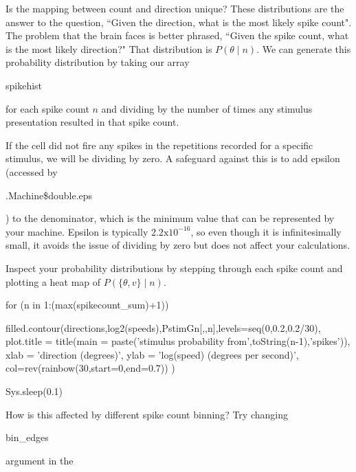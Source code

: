 \documentclass[
letterpaper, %
11pt, %
 oneside, 
onecolumn, %
]{memoir}
\numberwithin{Exercise}{chapter}
\begin{document}
Is the mapping between count and direction unique?  These distributions are the answer to the question, ``Given the direction, what is the most likely spike count".  The problem that the brain faces is better phrased, ``Given the spike count, what is the most likely direction?"  That distribution is $P(\theta \mid n)$. We can generate this probability distribution by taking our array \begin{ttfamily}spikehist\end{ttfamily} for each spike count $n$ and dividing by the number of times any stimulus presentation resulted in that spike count. 

If the cell did not fire any spikes in the repetitions recorded for a specific stimulus, we will be dividing by zero.  A safeguard against this is to add epsilon (accessed by \begin{ttfamily} .Machine\$double.eps \end{ttfamily}) to the denominator, which is the minimum value that can be represented by your machine. Epsilon is typically $ 2.2 \mathrm{x} 10^{-16} $, so even though it is infinitesimally small, it avoids the issue of dividing by zero but does not affect your calculations. 


Inspect your probability distributions by stepping through each spike count and plotting a heat map of $P(\{\theta, v\}\mid n)$. 

\begin{shortrcode}
for (n in 1:(max(spikecount_sum)+1)){
  
  
  filled.contour(directions,log2(speeds),PstimGn[,,n],levels=seq(0,0.2,0.2/30),
                 plot.title = title(main = paste('stimulus probability from',toString(n-1),'spikes')),
                                    xlab =  'direction (degrees)',
                                    ylab = 'log(speed) (degrees per second)',
                 col=rev(rainbow(30,start=0,end=0.7))
                 )

Sys.sleep(0.1)
}
\end{shortrcode}

How is this affected by different spike count binning? Try changing \begin{ttfamily}bin\_edges \end{ttfamily}argument in the
 
\end{document}
